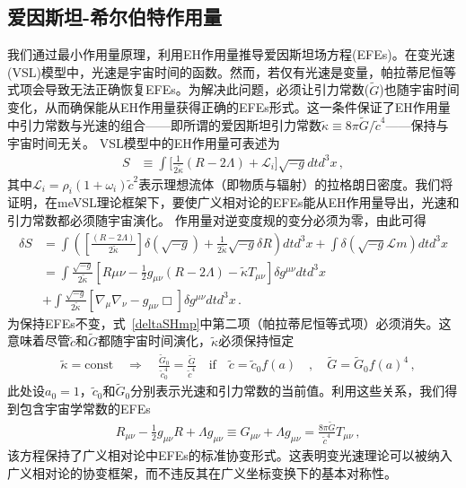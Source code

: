 \documentclass[jkps,preprint,fleqn]{revtex4}
\newcommand{\tc}{\tilde{c}}
\newcommand{\tG}{\tilde{G}}
\newcommand{\tkapp}{\tilde{\kappa}}
\begin{document}
\begin{CJK*}{UTF8}{gbsn}
\section{爱因斯坦-希尔伯特作用量}\label{sec:HEaction}

我们通过最小作用量原理，利用EH作用量推导爱因斯坦场方程(EFEs)。在变光速(VSL)模型中，光速是宇宙时间的函数。然而，若仅有光速是变量，帕拉蒂尼恒等式项会导致无法正确恢复EFEs。为解决此问题，必须让引力常数($\tG$)也随宇宙时间变化，从而确保能从EH作用量获得正确的EFEs形式\cite{Lee:2020zts}。这一条件保证了EH作用量中引力常数与光速的组合——即所谓的爱因斯坦引力常数$\tkapp \equiv 8 \pi \tG/\tc^4$——保持与宇宙时间无关。
VSL模型中的EH作用量可表述为
\begin{align} S &\equiv \int \Biggl[ \frac{1}{2 \tkapp} \left( R - 2 \Lambda \right) + \mathcal{L}_i \Biggr] \sqrt{-g} dt d^3x \label{SHmp} \,, \end{align}
其中$\mathcal{L}_i = \rho_i (1 + \omega_i) \tc^2$表示理想流体（即物质与辐射）的拉格朗日密度。我们将证明，在meVSL理论框架下，要使广义相对论的EFEs能从EH作用量导出，光速和引力常数都必须随宇宙演化。
作用量对逆变度规的变分必须为零，由此可得
\begin{align} \delta S &= \int \left( \left[ \frac{\left( R - 2 \Lambda \right)}{2 \tkapp} \right] \delta \left( \sqrt{-g} \right)  + \frac{1}{2\tkapp} \sqrt{-g} \delta R \right) dt d^3 x + \int \delta \left( \sqrt{-g} \mathcal{L}{m} \right) dt d^3 x \nonumber \\ &= \int \frac{\sqrt{-g}}{2 \tkapp} \left[ R{\mu\nu} - \frac{1}{2} g_{\mu\nu} \left( R - 2 \Lambda \right) - \tkapp T_{\mu\nu} \right] \delta g^{\mu\nu} dtd^3 x \nonumber \\ &+ \int \frac{\sqrt{-g}}{2 \tkapp} \left[ \nabla_{\mu} \nabla_{\nu} - g_{\mu\nu} \Box \right] \delta g^{\mu\nu} dtd^3 x \label{deltaSHmp} \,. \end{align}
为保持EFEs不变，式~\eqref{deltaSHmp}中第二项（帕拉蒂尼恒等式项）必须消失。这意味着尽管$\tc$和$\tG$都随宇宙时间演化，$\tkapp$必须保持恒定
\begin{align}
&\tkapp = \text{const} \quad \Rightarrow \quad \frac{\tG_0}{\tc_0^4} = \frac{\tG}{\tc^4} \quad \textrm{if} \quad \tc = \tc_0 f(a) \quad , \quad \tG = \tG_{0} f(a)^4 \label{tkappaconstmp} \,,
\end{align}
此处设$a_0 = 1$，$\tc_0$和$\tG_0$分别表示光速和引力常数的当前值。利用这些关系，我们得到包含宇宙学常数的EFEs
\begin{align} &R_{\mu\nu} - \frac{1}{2} g_{\mu\nu} R + \Lambda g_{\mu\nu} \equiv G_{\mu\nu} + \Lambda g_{\mu\nu}  = \frac{8 \pi \tG}{\tc^4} T_{\mu\nu} \label{tEFEmp} \,, \end{align}
该方程保持了广义相对论中EFEs的标准协变形式。这表明变光速理论可以被纳入广义相对论的协变框架，而不违反其在广义坐标变换下的基本对称性。

\end{CJK*}
\end{document}
